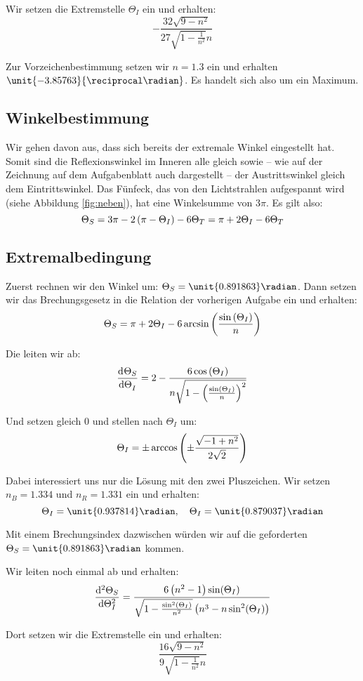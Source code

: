 \documentclass[11pt, ngerman, fleqn]{article}
\begin{document}
Wir setzen die Extremstelle $\Theta_I$ ein und erhalten:
\[
	-\frac{32 \sqrt{9-n^2}}{27 \sqrt{1-\frac{1}{n^2}} n}
\]

Zur Vorzeichenbestimmung setzen wir $n = 1.3$ ein und erhalten
$\unit{-3.85763}{\reciprocal\radian}$. Es handelt sich also um ein Maximum.

\subsection{Winkelbestimmung}

Wir gehen davon aus, dass sich bereits der extremale Winkel eingestellt hat.
Somit sind die Reflexionswinkel im Inneren alle gleich sowie -- wie auf der
Zeichnung auf dem Aufgabenblatt auch dargestellt -- der Austrittswinkel gleich
dem Eintrittswinkel. Das Fünfeck, das von den Lichtstrahlen aufgespannt wird
(siehe Abbildung \ref{fig:neben}), hat eine Winkelsumme von $3 \pi$. Es gilt
also:
\[
	\Theta_S = 3 \pi - 2 \del{\pi - \Theta_I} - 6 \Theta_T
	= \pi + 2 \Theta_I - 6 \Theta_T
\]

\subsection{Extremalbedingung}

Zuerst rechnen wir den Winkel um: $\Theta_S = \unit{0.891863}\radian$. Dann setzen wir das Brechungsgesetz in die Relation der vorherigen Aufgabe ein und erhalten:
\[
	\Theta_S = \pi + 2 \Theta_I - 6 \arcsin\del{\frac{\sin\del{\Theta_I}} n}
\]

Die leiten wir ab:
\[
	\dod{\Theta_S}{\Theta_I} = 2 - \frac{6 \cos{\del{\Theta_I}}}{n \sqrt{1 - \del{\frac{\sin\del{\Theta_I}}n}^2}}
\]

Und setzen gleich 0 und stellen nach $\Theta_I$ um:
\[
	\Theta_I = \pm \arccos\del{\pm \frac{\sqrt{-1 + n^2}}{2 \sqrt{2}}}
\]

Dabei interessiert uns nur die Lösung mit den zwei Pluszeichen. Wir setzen $n_B = 1.334$ und $n_R = 1.331$ ein und erhalten:
\[
	\Theta_I = \unit{0.937814}\radian
	,\quad
	\Theta_I = \unit{0.879037}\radian
\]

Mit einem Brechungsindex dazwischen würden wir auf die geforderten $\Theta_S = \unit{0.891863}\radian$ kommen.

Wir leiten noch einmal ab und erhalten:
\[
	\dod[2]{\Theta_S}{\Theta_I} = \frac{6 \left(n^2-1\right) \sin (\Theta_I)}{\sqrt{1-\frac{\sin ^2(\Theta_I)}{n^2}} \left(n^3-n \sin ^2(\Theta_I)\right)}
\]

Dort setzen wir die Extremstelle ein und erhalten:
\[
\frac{16 \sqrt{9-n^2}}{9 \sqrt{1-\frac{1}{n^2}} n}
\]
\end{document}
